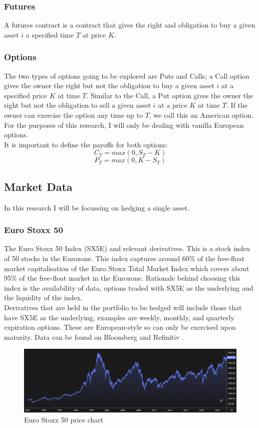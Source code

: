 \documentclass[12pt]{article}
\numberwithin{equation}{section}
\begin{document}
\subsubsection{Futures}
A futures contract is a contract that gives the right and obligation to buy a 
given asset $i$ a specified time $T$ at price $K$. 
\subsubsection{Options}
The two types of options going to be explored are Puts and Calls; a Call option 
gives the owner the right but not the obligation to buy a given asset $i$ at 
a specified price $K$ at time $T$. Similar to the Call, a Put option gives the 
owner the right but not the obligation to sell a given asset $i$ at a price $K$ 
at time $T$. If the owner can exercise the option any time up to $T$, we call 
this an American option. For the purposes of this research, I will only be 
dealing with vanilla European options.\\ 
It is important to define the payoffs for both options: 
\begin{equation}
C_T = max(0,S_T-K)
\end{equation}
\begin{equation}
P_T = max(0,K-S_T)
\end{equation}



\subsection{Market Data}
In this research I will be focussing on hedging a single asset. 
\subsubsection{Euro Stoxx 50}
The Euro Stoxx 50 Index (SX5E) and relevant derivatives. This is a stock index of 50 stocks in the Eurozone. 
This index captures around 60\% of the free-float market capitalisation of the 
Euro Stoxx Total Market Index which covers about 95\% of the free-float market 
in the Eurozone\autocite{a2021_euro}. Rationale behind choosing this index is the availability of data,
options traded with SX5E as the underlying and the liquidity of the index.
\\
Derivatives that are held in the portfolio to be hedged will include those that 
have SX5E as the underlying, examples are weekly, monthly, and quarterly
expiration options. These are European-style so can only be exercised upon 
maturity. Data can be found on Bloomberg\autocite{bloomberg_2023_bloomberg} and Refinitiv
\autocite{lseg}.
\begin{figure}[h]
    \centering
    \includegraphics[scale=0.35]{sx5e.png}
    \caption{Euro Stoxx 50 price chart}
\end{figure}
\end{document}
